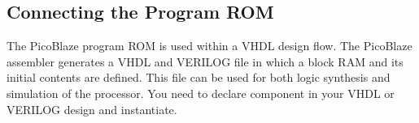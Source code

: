        \subsection{Connecting the Program ROM}
            The PicoBlaze program ROM is used within a VHDL design flow. The PicoBlaze assembler
                    generates a VHDL and VERILOG file in which a block RAM and its initial contents are defined. This
                    file can be used for both logic synthesis and simulation of the processor.
                    You need to declare component in your VHDL or VERILOG design and instantiate.
